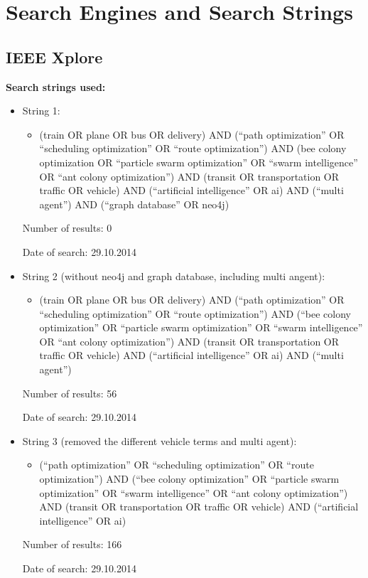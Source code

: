 \chapter{Search Engines and Search Strings}



\section{IEEE Xplore}

\textbf{Search strings used:}
\begin{itemize}
\item String 1:
\begin{itemize}
\item (train OR plane OR bus OR delivery) AND (``path optimization'' OR ``scheduling optimization'' OR ``route optimization'') AND (bee colony optimization OR ``particle swarm optimization'' OR ``swarm intelligence'' OR ``ant colony optimization'') AND (transit OR transportation OR traffic OR vehicle) AND (``artificial intelligence'' OR ai) AND (``multi agent'') AND (``graph database'' OR neo4j)
\end{itemize}
\par Number of results: 0
\par Date of search: 29.10.2014

\item String 2 (without neo4j and graph database, including multi angent):
\begin{itemize}
\item (train OR plane OR bus OR delivery) AND (``path optimization'' OR ``scheduling optimization'' OR ``route optimization'') AND (``bee colony optimization'' OR ``particle swarm optimization'' OR ``swarm intelligence'' OR ``ant colony optimization'') AND (transit OR transportation OR traffic OR vehicle) AND (``artificial intelligence'' OR ai) AND (``multi agent'') 
\end{itemize}
\par Number of results: 56
\par Date of search: 29.10.2014

\item String 3 (removed the different vehicle terms and multi agent):
\begin{itemize}
\item (``path optimization'' OR ``scheduling optimization'' OR ``route optimization'') AND (``bee colony optimization'' OR ``particle swarm optimization'' OR ``swarm intelligence'' OR ``ant colony optimization'') AND (transit OR transportation OR traffic OR vehicle) AND (``artificial intelligence'' OR ai) 
\end{itemize}
\par Number of results: 166
\par Date of search: 29.10.2014


\end{itemize}
